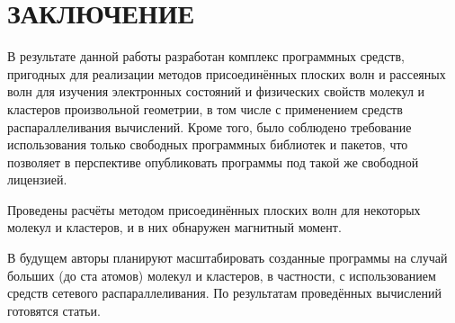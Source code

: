 \chapter*{ЗАКЛЮЧЕНИЕ}                       %

В результате данной работы разработан комплекс программных средств, пригодных для реализации методов присоединённых
плоских волн и рассеяных волн для изучения электронных состояний и физических свойств молекул и кластеров произвольной
геометрии, в том числе с применением средств распараллеливания вычислений. Кроме того, было соблюдено требование
использования только свободных программных библиотек и пакетов, что позволяет в перспективе опубликовать программы
под такой же свободной лицензией.

Проведены расчёты методом присоединённых плоских волн для некоторых молекул и кластеров, и в них обнаружен магнитный
момент.

В будущем авторы планируют масштабировать созданные программы на случай больших (до ста атомов) молекул и кластеров,
в частности, с использованием средств сетевого распараллеливания. По результатам проведённых вычислений готовятся
статьи.


% 
%

